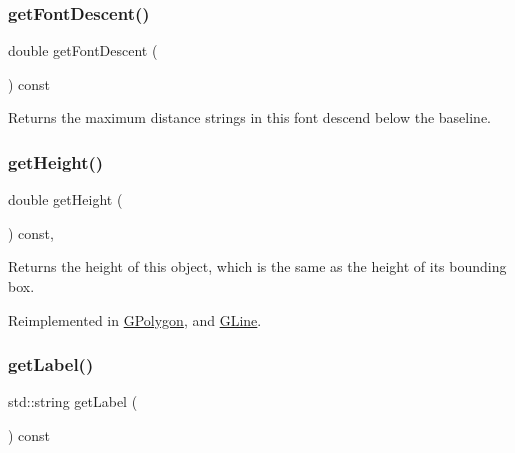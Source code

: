 \mbox{\label{classsgl_1_1GText_a2908216e19046c9747c0fc3b0d088621}} 
\subsubsection{\texorpdfstring{get\+Font\+Descent()}{getFontDescent()}}
{\footnotesize\ttfamily double get\+Font\+Descent (\begin{DoxyParamCaption}{ }\end{DoxyParamCaption}) const\hspace{0.3cm}{\ttfamily [virtual]}}



Returns the maximum distance strings in this font descend below the baseline. 

\mbox{\label{classsgl_1_1GObject_a1e7e353362434072875264cf95629f99}} 
\subsubsection{\texorpdfstring{get\+Height()}{getHeight()}}
{\footnotesize\ttfamily double get\+Height (\begin{DoxyParamCaption}{ }\end{DoxyParamCaption}) const\hspace{0.3cm}{\ttfamily [virtual]}, {\ttfamily [inherited]}}



Returns the height of this object, which is the same as the height of its bounding box. 



Reimplemented in \mbox{\hyperlink{classsgl_1_1GPolygon_a2bede8b27b21ae4c7940e762cbad9e07}{G\+Polygon}}, and \mbox{\hyperlink{classsgl_1_1GLine_a2bede8b27b21ae4c7940e762cbad9e07}{G\+Line}}.

\mbox{\label{classsgl_1_1GText_aa73aa351564b091c0658f2368c6d5c5f}} 
\subsubsection{\texorpdfstring{get\+Label()}{getLabel()}}
{\footnotesize\ttfamily std\+::string get\+Label (\begin{DoxyParamCaption}{ }\end{DoxyParamCaption}) const\hspace{0.3cm}{\ttfamily [virtual]}}



